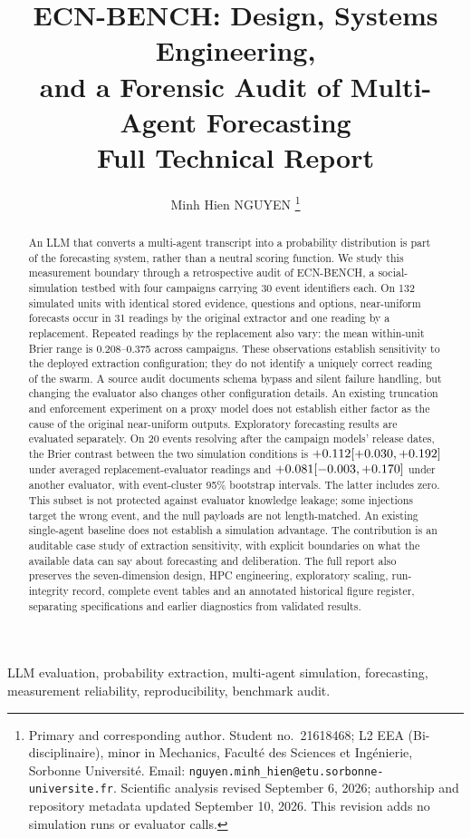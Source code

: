 \documentclass[10pt,conference]{IEEEtran}
\title{ECN-BENCH: Design, Systems Engineering,\\and a Forensic Audit of Multi-Agent Forecasting\\[0.3em]\large Full Technical Report}
\author{Minh Hien NGUYEN%
\thanks{Primary and corresponding author. Student no.~21618468; L2 EEA
(Bi-disciplinaire), minor in Mechanics, Facult\'e des Sciences et Ing\'enierie,
Sorbonne Universit\'e. Email: \texttt{nguyen.minh\_hien@etu.sorbonne-universite.fr}.
Scientific analysis revised September 6, 2026; authorship and repository metadata updated
September 10, 2026. This revision adds no simulation runs or evaluator calls.}}
\begin{document}
\maketitle

\begin{abstract}
An LLM that converts a multi-agent transcript into a probability distribution
is part of the forecasting system, rather than a neutral scoring function.
We study this measurement boundary through a retrospective audit of ECN-BENCH,
a social-simulation testbed with four campaigns carrying 30 event identifiers each.
On 132 simulated units with identical stored evidence, questions and options,
near-uniform forecasts occur in 31 readings by the original extractor and one
reading by a replacement. Repeated readings by the replacement also vary:
the mean within-unit Brier range is 0.208--0.375 across campaigns.
These observations establish sensitivity to the deployed extraction configuration;
they do not identify a uniquely correct reading of the swarm.
A source audit documents schema bypass and silent failure handling, but changing
the evaluator also changes other configuration details. An existing truncation
and enforcement experiment on a proxy model does not establish either factor
as the cause of the original near-uniform outputs.
Exploratory forecasting results are evaluated separately. On 20 events resolving
after the campaign models' release dates, the Brier contrast between the two
simulation conditions is $+0.112 [+0.030, +0.192]$ under averaged replacement-evaluator
readings and $+0.081 [-0.003, +0.170]$ under another evaluator, with event-cluster
95\% bootstrap intervals. The latter includes zero. This subset is not protected
against evaluator knowledge leakage; some injections target the wrong event,
and the null payloads are not length-matched. An existing single-agent baseline
does not establish a simulation advantage. The contribution is an auditable
case study of extraction sensitivity, with explicit boundaries on what the
available data can say about forecasting and deliberation. The full report also
preserves the seven-dimension design, HPC engineering, exploratory scaling,
run-integrity record, complete event tables and an annotated historical figure
register, separating specifications and earlier diagnostics from validated results.
\end{abstract}
\begin{IEEEkeywords}
LLM evaluation, probability extraction, multi-agent simulation, forecasting,
measurement reliability, reproducibility, benchmark audit.
\end{IEEEkeywords}
\end{document}
